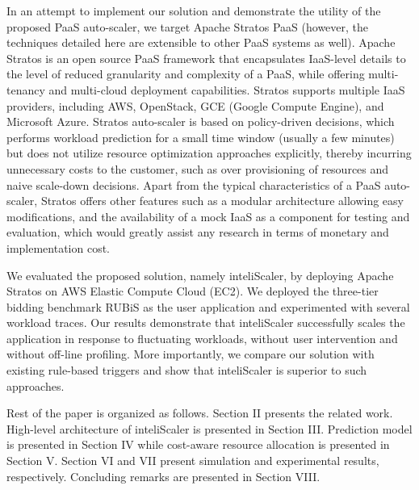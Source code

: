 In an attempt to implement our solution and demonstrate the utility of the proposed PaaS auto-scaler, we target Apache Stratos PaaS (however, the techniques detailed here are extensible to other PaaS systems as well). Apache Stratos is an open source PaaS framework that encapsulates IaaS-level details to the level of reduced granularity and complexity of a PaaS, while offering multi-tenancy and multi-cloud deployment capabilities. Stratos supports multiple IaaS providers, including AWS, OpenStack, GCE (Google Compute Engine), and Microsoft Azure\cite{website:stratos}. Stratos auto-scaler is based on policy-driven decisions, which performs workload prediction for a small time window (usually a few minutes) but does not utilize resource optimization approaches explicitly, thereby incurring unnecessary costs to the customer, such as over provisioning of resources and naive scale-down decisions. Apart from the typical characteristics of a PaaS auto-scaler, Stratos offers other features such as a modular architecture allowing easy modifications, and the availability of a mock IaaS as a component for testing and evaluation, which would greatly assist any research in terms of monetary and implementation cost.

We evaluated the proposed solution, namely inteliScaler, by deploying Apache Stratos on AWS Elastic Compute Cloud (EC2). We deployed the three-tier bidding benchmark RUBiS as the user application and experimented with several workload traces. Our results demonstrate that inteliScaler successfully scales the application in response to fluctuating workloads, without user intervention and without off-line profiling. More importantly, we compare our solution with existing rule-based triggers and show that inteliScaler is superior to such approaches.

Rest of the paper is organized as follows. Section II presents the related work. High-level architecture of inteliScaler is presented in Section III. Prediction model is presented in Section IV while cost-aware resource allocation is presented in Section V. Section VI and VII present simulation and experimental results, respectively. Concluding remarks are presented in Section VIII.